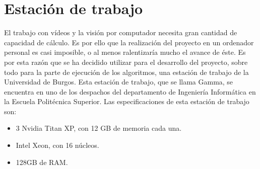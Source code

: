 \section{Estación de trabajo}
El trabajo con vídeos y la visión por computador necesita gran cantidad de capacidad de cálculo. Es por ello que la realización del proyecto en un ordenador personal es casi imposible, o al menos ralentizaría mucho el avance de éste. Es por esta razón que se ha decidido utilizar para el desarrollo del proyecto, sobre todo para la parte de ejecución de los algoritmos, una estación de trabajo de la Universidad de Burgos. Esta estación de trabajo, que se llama Gamma, se encuentra en uno de los despachos del departamento de Ingeniería Informática en la Escuela Politécnica Superior. Las especificaciones de esta estación de trabajo son:
\begin{itemize}
	\item 3 Nvidia Titan XP, con 12 GB de memoria cada una.
	\item Intel Xeon, con 16 núcleos.
	\item 128GB de RAM.
\end{itemize}